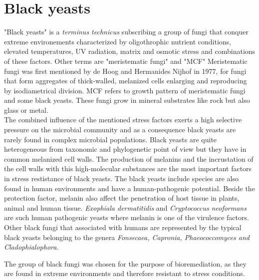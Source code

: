 \documentclass[12pt, a4paper]{report}
\begin{document}
\section{Black yeasts} 
"Black yeasts" is a \textit{terminus technicus} subscribing a group of fungi that conquer extreme environements characterized by oligothrophic nutrient conditions, elevated temperatures, UV radiation, matrix and osmotic stress and combinations of these factors. Other terms are "meristematic fungi" and "MCF" 
Meristematic fungi was first mentioned by de Hoog and Hermanides Nijhof in 1977, for fungi that form aggregates of thick-walled, melanized cells enlarging and reproducing by isodiametrical division. MCF refers to growth pattern of meristematic fungi and some black yeasts. These fungi grow in mineral substrates like rock but also glass or metal.\cite{Sterflinger2006} \\
The combined influence of the mentioned stress factors exerts a high selective pressure on the microbial community and as a consequence black yeasts are rarely found in complex microbial populations. Black yeasts are quite heterogeneous from taxonomic and phylogenetic point of view but they have in common melanized cell walls. The production of melanins and the incrustation of the cell walls with this high-molecular substances are the most important factors in stress restistance of black yeasts. The black yeasts include species are also found in human environments and have a human-pathogenic potential. Beside the protection factor, melanin also affect the penetration of host tissue in plants, animal and human tissue. \textit{Exophiala dermatitidis} and \textit{Cryptococcus neoformans} are such human pathogenic yeasts where melanin is one of the virulence factors. \cite{Hoog2003, Sterflinger2006} Other black fungi that associated with humans are represented by the typical black yeasts belonging to the genera \textit{Fonsecaea, Capronia, Phaeococcomyces and Cladophialophora}. \cite{Blasi2015} 

The group of black fungi was chosen for the purpose of bioremediation, as they are found in extreme environments and therefore resistant to stress conditions. \cite{Poyntner2014} 
\end{document}
